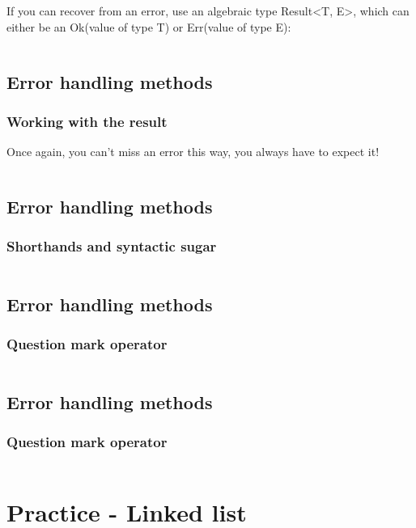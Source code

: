 \documentclass[usenames,twocolumn,dvipsnames,10pt,a4wide]{article}
\begin{document}
\normalsize
If you can recover from an error, use an algebraic
type Result<T, E>, which can either be an
Ok(value of type T) or 
Err(value of type E):

\inputminted[fontsize=\normalsize]{rust}{code/error2.rs}



\subsection{Error handling methods}
\subsubsection{Working with the result}
\large
Once again, you can't miss an error this way,
you always have to expect it!

\inputminted[fontsize=\normalsize]{rust}{code/error3.rs}



\subsection{Error handling methods}
\subsubsection{Shorthands and syntactic sugar}
\normalsize
\inputminted[fontsize=\normalsize]{rust}{code/error4.rs}


\subsection{Error handling methods}
\subsubsection{Question mark operator}
\inputminted[fontsize=\normalsize]{rust}{code/error5.rs}



\subsection{Error handling methods}
\subsubsection{Question mark operator}
\inputminted[fontsize=\normalsize]{rust}{code/error6.rs}



\section{Practice - Linked list}
\end{document}
